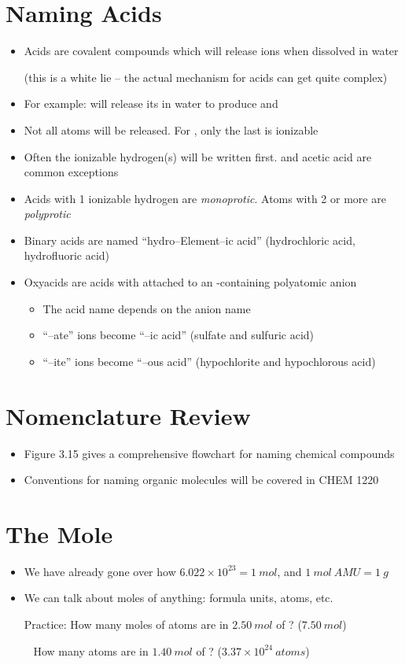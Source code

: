 \documentclass[12pt, openany, letterpaper]{memoir}
\begin{document}
\section{Naming Acids}
\begin{itemize}
	\item Acids are covalent compounds which will release  ions when dissolved in water

	      (this is a white lie -- the actual mechanism for acids can get quite complex)
	\item For example:  will release its  in water to produce  and 
	\item Not all  atoms will be released. For , only the last  is ionizable
	\item Often the ionizable hydrogen(s) will be written first.  and acetic acid are common exceptions
	\item Acids with 1 ionizable hydrogen are \emph{monoprotic}. Atoms with 2 or more are \emph{polyprotic}
	\item Binary acids are named ``hydro--Element--ic acid'' (hydrochloric acid, hydrofluoric acid)
	\item Oxyacids are acids with  attached to an -containing polyatomic anion
	      \begin{itemize}
		      \item The acid name depends on the anion name
		      \item ``--ate'' ions become ``--ic acid'' (sulfate and sulfuric acid)
		      \item ``--ite'' ions become ``--ous acid'' (hypochlorite and hypochlorous acid)
	      \end{itemize}
\end{itemize}
\section{Nomenclature Review}
\begin{itemize}
	\item Figure 3.15 gives a comprehensive flowchart for naming chemical compounds
	\item Conventions for naming organic molecules will be covered in CHEM 1220
\end{itemize}
\section{The Mole}
\begin{itemize}
	\item We have already gone over how $6.022\times10^{23}=1~mol$, and $1~mol~AMU=1~g$
	\item We can talk about moles of anything: formula units, atoms, etc.

	      Practice: How many moles of  atoms are in $2.50~mol$ of ? ($7.50~mol$)

	      ~\hphantom{Practice:} How many  atoms are in $1.40~mol$ of ? ($3.37\times10^{24}~atoms$)
\end{itemize}
\end{document}
